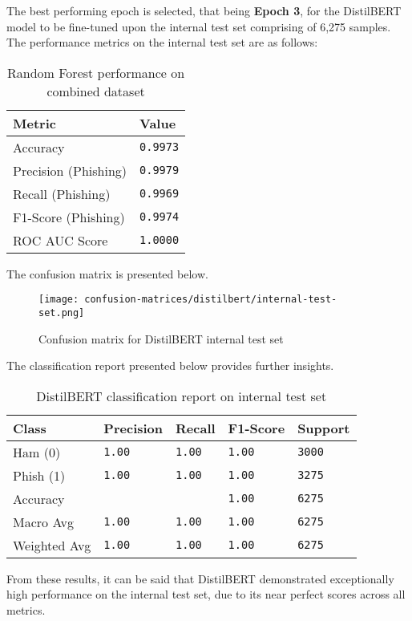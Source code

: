\noindent The best performing epoch is selected, that being \textbf{Epoch 3}, for the DistilBERT model to be fine-tuned upon the internal test set comprising of 6,275 samples. The performance metrics on the internal test set are as follows:

\begin{table}[h]
\centering
\begin{tabularx}{\textwidth}{|X|X|}
\hline
\textbf{Metric} & \textbf{Value} \\
\hline
Accuracy & \texttt{0.9973} \\
\hline
Precision (Phishing) & \texttt{0.9979} \\
\hline
Recall (Phishing) & \texttt{0.9969} \\
\hline
F1-Score (Phishing) & \texttt{0.9974} \\
\hline
ROC AUC Score  & \texttt{1.0000} \\
\hline
\end{tabularx}
\caption{Random Forest performance on combined dataset}
\end{table}

\noindent The confusion matrix is presented below.

\begin{figure}[H]
  \begin{center}
    \texttt{[image: confusion-matrices/distilbert/internal-test-set.png]}
    \caption{Confusion matrix for DistilBERT internal test set}
  \end{center}
\end{figure}

\noindent The classification report presented below provides further insights.

\begin{table}[h]
\centering
\begin{tabularx}{\textwidth}{|X|X|X|X|X|}
\hline
\textbf{Class} & \textbf{Precision} & \textbf{Recall} & \textbf{F1-Score} & \textbf{Support} \\
\hline
Ham (0) & \texttt{1.00} & \texttt{1.00} & \texttt{1.00} & \texttt{3000} \\
\hline
Phish (1) & \texttt{1.00} & \texttt{1.00} & \texttt{1.00} & \texttt{3275} \\
\hline
Accuracy & & & \texttt{1.00} & \texttt{6275} \\
\hline
Macro Avg & \texttt{1.00} & \texttt{1.00} & \texttt{1.00} & \texttt{6275} \\
\hline
Weighted Avg & \texttt{1.00} & \texttt{1.00} & \texttt{1.00} & \texttt{6275} \\
\hline
\end{tabularx}
\caption{DistilBERT classification report on internal test set}
\end{table}

\noindent From these results, it can be said that DistilBERT demonstrated exceptionally high performance on the internal test set, due to its near perfect scores across all metrics.
